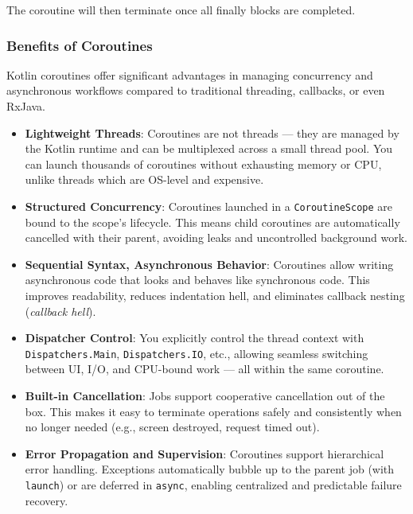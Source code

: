\documentclass[a4paper,12pt]{article}
\begin{document}
The coroutine will then terminate once all finally blocks are completed.

\subsubsection{Benefits of Coroutines}

Kotlin coroutines offer significant advantages in managing concurrency and asynchronous workflows compared to traditional threading, callbacks, or even RxJava.

\begin{itemize}
  \item \textbf{Lightweight Threads}:  
  Coroutines are not threads — they are managed by the Kotlin runtime and can be multiplexed across a small thread pool. You can launch thousands of coroutines without exhausting memory or CPU, unlike threads which are OS-level and expensive.

  \item \textbf{Structured Concurrency}:  
  Coroutines launched in a \texttt{CoroutineScope} are bound to the scope's lifecycle. This means child coroutines are automatically cancelled with their parent, avoiding leaks and uncontrolled background work.

  \item \textbf{Sequential Syntax, Asynchronous Behavior}:  
  Coroutines allow writing asynchronous code that looks and behaves like synchronous code. This improves readability, reduces indentation hell, and eliminates callback nesting (\textit{callback hell}).

  \item \textbf{Dispatcher Control}:  
  You explicitly control the thread context with \texttt{Dispatchers.Main}, \texttt{Dispatchers.IO}, etc., allowing seamless switching between UI, I/O, and CPU-bound work — all within the same coroutine.

  \item \textbf{Built-in Cancellation}:  
  Jobs support cooperative cancellation out of the box. This makes it easy to terminate operations safely and consistently when no longer needed (e.g., screen destroyed, request timed out).

  \item \textbf{Error Propagation and Supervision}:  
  Coroutines support hierarchical error handling. Exceptions automatically bubble up to the parent job (with \texttt{launch}) or are deferred in \texttt{async}, enabling centralized and predictable failure recovery.


\end{itemize}
\end{document}
